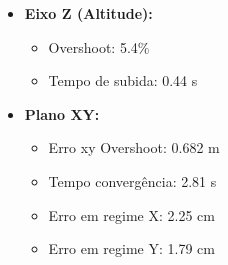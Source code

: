 \begin{itemize}
  \item \textbf{Eixo Z (Altitude):}
  \begin{itemize}
    \item Overshoot: 5.4\%
    \item Tempo de subida: 0.44 s
  \end{itemize}
  \item \textbf{Plano XY:}
  \begin{itemize}
    \item Erro xy Overshoot: 0.682 m
    \item Tempo convergência: 2.81 s
    \item Erro em regime X: 2.25 cm
    \item Erro em regime Y: 1.79 cm
  \end{itemize}
\end{itemize}
